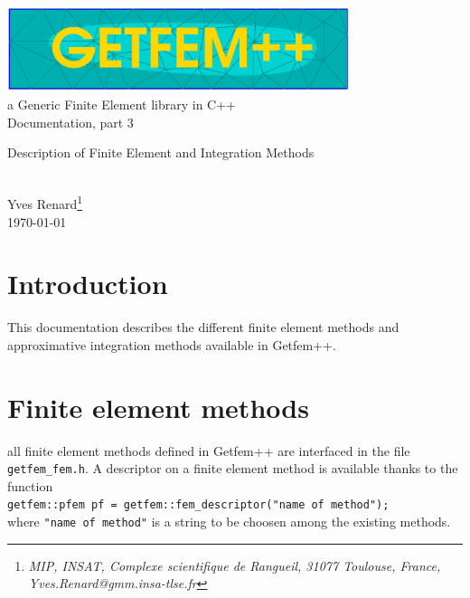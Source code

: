 \documentclass[11pt,a4paper]{article}
\begin{document}
\begin{center}
  \includegraphics[width=10cm,angle=0]{getfem_logo.eps}\\[0.2cm]
  a Generic Finite Element library in C++ \\[0.5cm]
  {\LARGE Documentation, part \Huge 3} \\[0.5cm]
  \begin{largebox} \begin{center}
      \Huge \sc Description of Finite Element and Integration Methods
  \end{center}  \end{largebox}
  \\[0.5cm]
  { \large Yves \sc Renard\footnote{ \it MIP, INSAT, Complexe scientifique de Rangueil, 31077 Toulouse, France, Yves.Renard@gmm.insa-tlse.fr } } \\[1.0cm]
      \today \\[1.0cm]
\end{center}




\section*{Introduction}
This documentation describes the different finite element methods and approximative integration methods available in {\sc Getfem++}.\\[4cm]


\newpage
\tableofcontents
\newpage

\section{Finite element methods}

all finite element methods defined in {\sc Getfem++} are interfaced in the file {\tt getfem\_fem.h}.
A descriptor on a finite element method is available thanks to the function\\[0.5cm]
{\tt getfem::pfem pf = getfem::fem\_descriptor("name of method");
}\\[0.5cm]
where {\tt "name of method"} is a string to be choosen among the existing methods.
\end{document}
